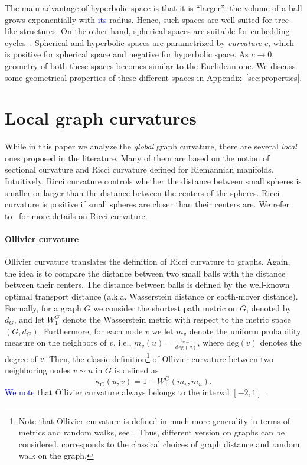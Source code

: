 \documentclass{article} %
\newcommand{\ph}[1]{\textcolor{blue}{#1}}
\begin{document}
The main advantage of hyperbolic space is that it is ``larger'': the volume of a ball grows exponentially with \ph{its} radius. Hence, such spaces are well suited for tree-like structures. On the other hand, spherical spaces are suitable for embedding cycles~\citep{gu2019learning}. Spherical and hyperbolic spaces are parametrized by \textit{curvature} $c$, which is positive for spherical space and negative for hyperbolic space. As $c \to 0$, geometry of both these spaces becomes similar to the Euclidean one. We discuss some geometrical properties of these different spaces in Appendix~\ref{sec:properties}.


\section{Local graph curvatures}

While in this paper we analyze the \textit{global} graph curvature, there are several \textit{local} ones proposed in the literature. Many of them are based on the notion of sectional curvature and Ricci curvature defined for Riemannian manifolds. Intuitively, Ricci curvature controls whether the distance between small spheres is smaller or larger than the distance between the centers of the spheres. Ricci curvature is positive if small spheres are closer than their centers are. We refer to~\citep{jost2009geometry,oneill1983semiriemannian} for more details on Ricci curvature.

\paragraph{Ollivier curvature}

Ollivier curvature translates the definition of Ricci curvature to graphs. Again, the idea is to compare the distance between two small balls with the distance between their centers. The distance between balls is defined by the well-known optimal transport distance (a.k.a. Wasserstein distance or earth-mover distance).
Formally, for a graph $G$ we consider the shortest path metric on $G$, denoted by $d_G$, and let $W_1^G$ denote the Wasserstein metric with respect to the metric space $(G,d_G)$. Furthermore, for each node $v$ we let $m_v$ denote the uniform probability measure on the neighbors of $v$, i.e., $m_v(u) = \frac{1_{u \sim v}}{\mathrm{deg}(v)}$, where $\mathrm{deg}(v)$ denotes the degree of $v$. Then, the classic definition\footnote{Note that Ollivier curvature is defined in much more generality in terms of metrics and random walks, see~\citep{ollivier2009ricci}. Thus, different version on graphs can be considered.  corresponds to the classical choices of graph distance and random walk on the graph.} of Ollivier curvature between two neighboring nodes $v \sim u$ in $G$ is defined as
\begin{equation}\label{eq:def_classic_ollivier_graphs}
	\kappa_G(u,v) = 1 - W_1^G(m_v, m_u).
\end{equation}
\ph{We note} that Ollivier curvature always belongs to the interval $[-2,1]$~\citep{jost2014ollivier}.
\end{document}
